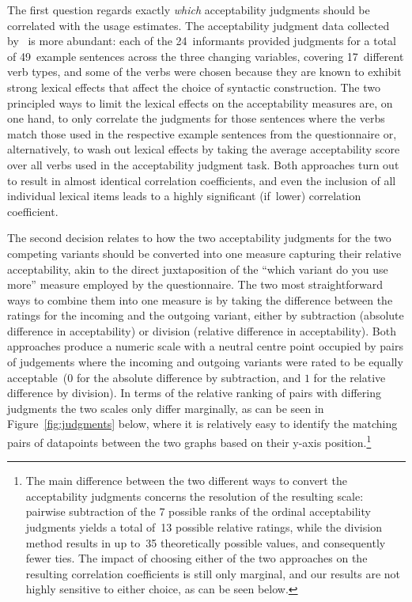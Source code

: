 The first question regards exactly \emph{which} acceptability judgments should be correlated with the usage estimates. The acceptability judgment data collected by~\citet{Jamieson2015} is more abundant: each of the 24~informants provided judgments for a total of 49~example sentences across the three changing variables, covering 17~different verb types, and some of the verbs were chosen because they are known to exhibit strong lexical effects that affect the choice of syntactic construction. The two principled ways to limit the lexical effects on the acceptability measures are, on one hand, to only correlate the judgments for those sentences where the verbs match those used in the respective example sentences from the questionnaire or, alternatively, to wash out lexical effects by taking the average acceptability score over all verbs used in the acceptability judgment task. Both approaches turn out to result in almost identical correlation coefficients, and even the inclusion of all individual lexical items leads to a highly significant (if~lower) correlation coefficient.

The second decision relates to how the two acceptability judgments for the two competing variants should be converted into one measure capturing their relative acceptability, akin to the direct juxtaposition of the ``which variant do you use more'' measure employed by the questionnaire. The two most straightforward ways to combine them into one measure is by taking the difference between the ratings for the incoming and the outgoing variant, either by subtraction (absolute difference in acceptability) or division (relative difference in acceptability). %
Both approaches produce a numeric scale with a neutral centre point occupied by pairs of judgements where the incoming and outgoing variants were rated to be equally acceptable~($0$ for the absolute difference by subtraction, and $1$ for the relative difference by division). In terms of the relative ranking of pairs with differing judgments the two scales only differ marginally, as can be seen in Figure~\ref{fig:judgments} below, where it is relatively easy to identify the matching pairs of datapoints between the two graphs based on their y-axis position.\footnote{The main difference between the two different ways to convert the acceptability judgments concerns the resolution of the resulting scale: pairwise subtraction of the 7 possible ranks of the ordinal acceptability judgments yields a total of~13 possible relative ratings, while the division method results in up to~35 theoretically possible values, and consequently fewer ties. The impact of choosing either of the two approaches on the resulting correlation coefficients is still only marginal, and our results are not highly sensitive to either choice, as can be seen below.} %

